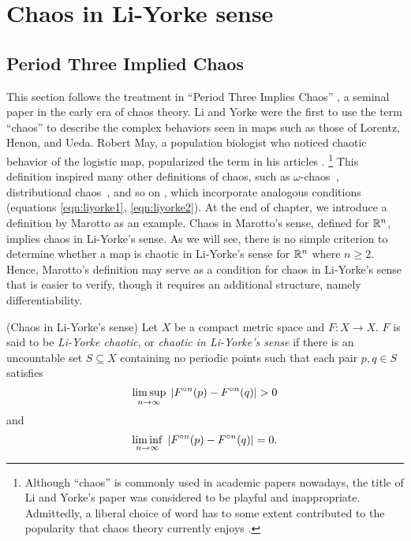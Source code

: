 \documentclass[12pt,draft,twoside]{book}
\begin{document}
\chapter{Chaos in Li-Yorke sense}

\section{Period Three Implied Chaos}
This section follows the treatment in ``Period Three Implies Chaos'' \citep{li-yorke}, a seminal paper in the early era of chaos theory.
Li and Yorke were the first to use the term ``chaos'' to describe the complex behaviors seen in maps such as those of Lorentz, Henon, and Ueda.
Robert May, a population biologist who noticed chaotic behavior of the logistic map, popularized the term in his articles \citeyearpar{may1,may2}.
\footnote{Although ``chaos'' is commonly used in academic papers nowadays, the title of Li and Yorke's paper was considered to be playful and inappropriate.
Admittedly, a liberal choice of word has to some extent contributed to the popularity that chaos theory currently enjoys \citep[``Exploring Chaos on an Interval'']{ueda-abraham}.}
This definition inspired many other definitions of chaos, such as $\omega$-chaos~\citep{omegachaos}, distributional chaos~\citep{dchaos1}, and so on \citep{genericchaos,densechaos,extremechaos}, which incorporate analogous conditions (equations \ref{eqn:liyorke1}, \ref{eqn:liyorke2}).
At the end of chapter, we introduce a definition by Marotto as an example.
Chaos in Marotto's sense, defined for $\mathbb{R}^n$, implies chaos in Li-Yorke's sense.
As we will see, there is no simple criterion to determine whether a map is chaotic in Li-Yorke's sense for $\mathbb{R}^n$ where $n \geq 2$.
Hence, Marotto's definition may serve as a condition for chaos in Li-Yorke's sense that is easier to verify, though it requires an additional structure, namely differentiability.


\begin{definition}
  (Chaos in Li-Yorke's sense)
  Let $X$ be a compact metric space and $F: X\to X$.
  $F$ is said to be \textit{Li-Yorke chaotic}, or 
  \textit{chaotic in Li-Yorke's sense} if there is an uncountable set $S \subseteq X$ containing no
  periodic points such that each pair $p,q \in S$ satisfies
  \begin{equation}
    \limsup\limits_{n \to \infty}\; \left | F^{\circ n}(p) - F^{\circ n}(q) \right | > 0
    \label{eqn:liyorke1}
  \end{equation}
  and
  \begin{equation}
    \liminf\limits_{n \to \infty}\; \left | F^{\circ n}(p) - F^{\circ n}(q) \right | = 0.
    \label{eqn:liyorke2}
  \end{equation}
\end{definition}
\end{document}
